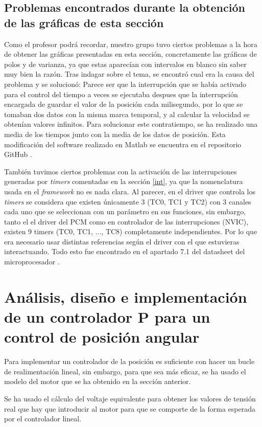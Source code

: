 \documentclass[a4paper]{article}
\begin{document}
\subsection{Problemas encontrados durante la obtención de las gráficas de esta sección}
Como el profesor podrá recordar, nuestro grupo tuvo ciertos problemas a la hora de obtener las gráficas presentadas en esta sección, concretamente las gráficas de polos y de varianza,
ya que estas aparecían con intervalos en blanco sin saber muy bien la razón. Tras indagar sobre el tema, se encontró cual era la causa
del problema y se solucionó: Parece ser que la interrupción que se había activado para el control del tiempo a veces se ejecutaba despues que
la interrupción encargada de guardar el valor de la posición cada milisegundo, por lo que se tomaban dos datos con la misma marca temporal,
y al calcular la velocidad se obtenían valores infinitos.
Para solucionar este contratiempo, se ha realizado una media de los tiempos junto con la media de los datos de posición.
Esta modificación del software realizado en Matlab se encuentra en el repositorio GitHub \cite{git}.

También tuvimos ciertos problemas con la activación de las interrupciones generadas por \emph{timers} comentadas en la sección \ref{int}, ya que la nomenclatura usada en el \emph{framework} no es nada clara.
Al parecer, en el driver que controla los \emph{timers} se considera que existen únicamente 3 (TC0, TC1 y TC2) con 3 canales cada uno que se seleccionan con un parámetro en sus funciones,
sin embargo, tanto el el driver del PCM como en controlador de las interrupciones (NVIC), existen 9 timers (TC0, TC1, ..., TC8) completamente independientes. Por lo que era necesario
usar distintas referencias según el driver con el que estuvieras interactuando. Todo esto fue encontrado en el apartado 7.1 del datasheet del microprocesador \cite{SAM3X/A}.

\section{Análisis, diseño e implementación de un controlador P para un control de posición angular \label{sec:control}}

Para implementar un controlador de la posición es suficiente con hacer un bucle de realimentación lineal,
sin embargo, para que sea más eficaz, se ha usado el modelo del motor que se ha obtenido en la sección anterior.

Se ha usado el cálculo del voltaje equivalente para obtener los valores de tensión real que hay que introducir al motor para que se comporte de la forma esperada por el
controlador lineal.
\end{document}
